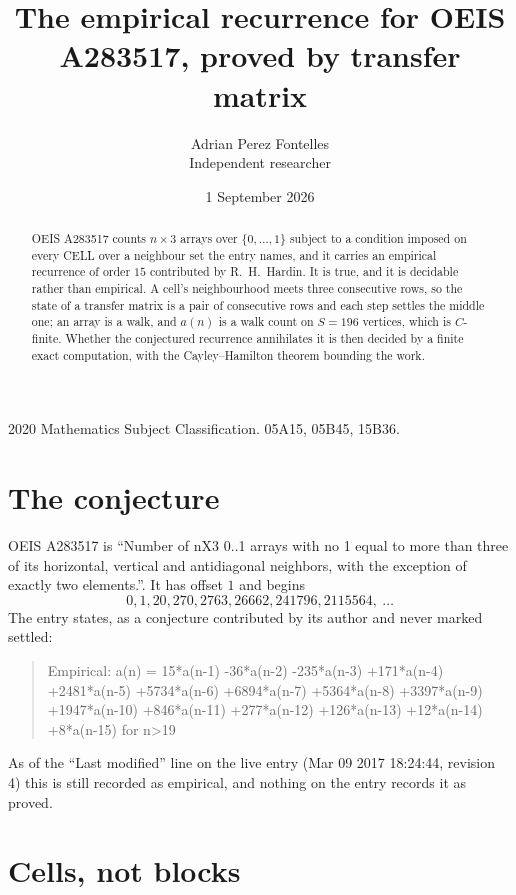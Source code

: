 \documentclass[11pt,a4paper]{article}
\title{The empirical recurrence for OEIS A283517, proved by transfer matrix}
\author{Adrian Perez Fontelles\\ \small Independent researcher}
\date{1 September 2026}
\theoremstyle{plain}
\theoremstyle{definition}
\begin{document}
\maketitle

\begin{abstract}
OEIS A283517 counts $n\times3$ arrays over $\{0,\dots,1\}$ subject to a condition imposed on
every CELL over a neighbour set the entry names, and it carries an empirical recurrence of
order $15$ contributed by R.~H.~Hardin. It is true, and it is decidable rather than
empirical. A cell's neighbourhood meets three consecutive rows, so the state of a transfer
matrix is a pair of consecutive rows and each step settles the middle one; an array is a
walk, and $a(n)$ is a walk count on $S=196$ vertices, which is $C$-finite. Whether the
conjectured recurrence annihilates it is then decided by a finite exact computation, with the
Cayley--Hamilton theorem bounding the work.
\end{abstract}

\noindent\small 2020 Mathematics Subject Classification. 05A15, 05B45, 15B36.\normalsize

\section{The conjecture}

OEIS A283517 is ``Number of nX3 0..1 arrays with no 1 equal to more than three of its horizontal, vertical and antidiagonal neighbors, with the exception of exactly two elements.''. It has offset $1$ and begins
\[
0, 1, 20, 270, 2763, 26662, 241796, 2115564,\ \dots
\]
The entry states, as a conjecture contributed by its author and never marked settled:
\begin{quote}
Empirical: a(n) = 15*a(n-1) -36*a(n-2) -235*a(n-3) +171*a(n-4) +2481*a(n-5) +5734*a(n-6) +6894*a(n-7) +5364*a(n-8) +3397*a(n-9) +1947*a(n-10) +846*a(n-11) +277*a(n-12) +126*a(n-13) +12*a(n-14) +8*a(n-15) for n>19
\end{quote}
As of the ``Last modified'' line on the live entry (Mar 09 2017 18:24:44, revision 4) this is still
recorded as empirical, and nothing on the entry records it as proved.

\section{Cells, not blocks}
\end{document}
